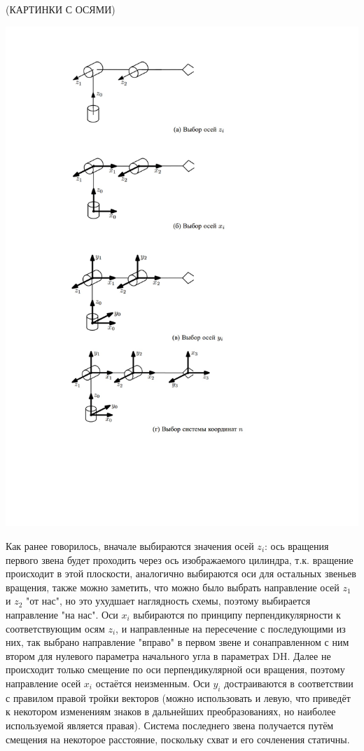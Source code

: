 \documentclass[12pt,a4paper,openany]{extarticle}
\begin{document}
(КАРТИНКИ С ОСЯМИ)\\

\begin{center}
    \includegraphics[width=\textwidth]{axes.jpg}\\
\end{center}

\hspace*{\parindent}Как ранее говорилось, вначале выбираются значения осей $z_i$: ось вращения первого звена будет проходить через ось изображаемого цилиндра, т.к. вращение происходит в этой плоскости, аналогично выбираются оси для остальных звеньев вращения, также можно заметить, что можно было выбрать направление осей $z_1$ и $z_2$ "от нас", но это  ухудшает наглядность схемы, поэтому выбирается направление "на нас". Оси $x_i$ выбираются по принципу перпендикулярности к соответствующим осям $z_i$, и направленные на пересечение с последующими из них, так выбрано направление "вправо" в первом звене и сонаправленном с ним втором для нулевого параметра начального угла в параметрах DH. Далее не происходит только смещение по оси перпендикулярной оси вращения, поэтому направление осей $x_i$ остаётся неизменным. Оси $y_i$ достраиваются в соответствии с правилом правой тройки векторов (можно использовать и левую, что приведёт к некотором изменениям знаков в дальнейших преобразованиях, но наиболее используемой является правая). Система последнего звена получается путём смещения на некоторое расстояние, поскольку схват и его сочленения статичны.\\
 
\end{document}
